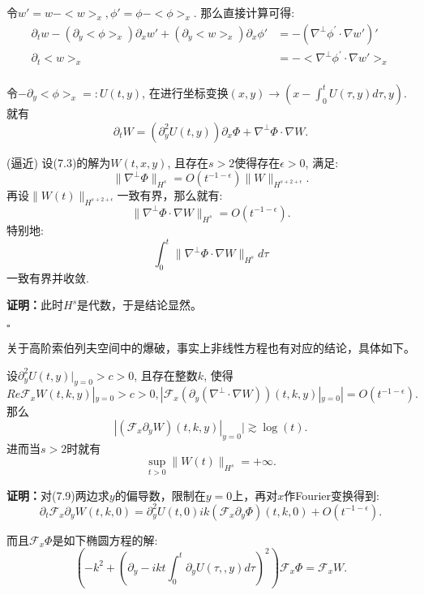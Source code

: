 令$w'=w-<w>_x,\phi'=\phi-<\phi>_x$. 那么直接计算可得:
\[
\begin{aligned}
\partial_t w-(\partial_y<\phi>_x)\partial_x w'+(\partial_y<w>_x)\partial_x\phi'&=-(\nabla^{\perp}\phi^{'}\cdot\nabla w')'\\
\partial_t <w>_x&=-<\nabla^{\perp}\phi^{'}\cdot\nabla w'>_x \\
\end{aligned}
\]

令$-\partial_y <\phi>_x=:U(t,y)$, 在进行坐标变换$(x,y)\rightarrow(x-\int_0^t U(\tau,y)d\tau,y)$. 就有
\begin{equation}
\partial_t W=(\partial_y^2 U(t,y))\partial_x\Phi+\nabla^{\perp}\Phi\cdot\nabla W.
\end{equation}

\begin{thm}\songti\rm (逼近)
设(7.3)的解为$W(t,x,y)$, 且存在$s>2$使得存在$\epsilon>0$, 满足:$$\|\nabla^{\perp}\Phi\|_{H^s}=O(t^{-1-\epsilon})\|W\|_{H^{s+2+\epsilon}}.$$ 再设$\|W(t)\|_{H^{s+2+\epsilon}}$一致有界，那么就有:
$$\|\nabla^{\perp}\Phi\cdot\nabla W\|_{H^s}=O(t^{-1-\epsilon}).$$ 特别地:$$\int_0^t\|\nabla^{\perp}\Phi\cdot\nabla W\|_{H^s}d\tau$$一致有界并收敛.
\end{thm}

\textbf{证明：}此时$H^s$是代数，于是结论显然。
\begin{flushright}
$\square$
\end{flushright}

关于高阶索伯列夫空间中的爆破，事实上非线性方程也有对应的结论，具体如下。
\begin{thm}\songti\rm
设$\partial_y^2U(t,y)|_{y=0}>c>0$, 且存在整数$k$, 使得$$Re\mathcal{F}_xW(t,k,y)|_{y=0}>c>0, |\mathcal{F}_x(\partial_y (\nabla^{\perp}\cdot\nabla W))(t,k,y)|_{y=0}|=O(t^{-1-\epsilon}).$$ 那么$$|(\mathcal{F}_x\partial_y W)(t,k,y)|_{y=0}|\gtrsim\log(t).$$ 进而当$s>2$时就有$$\sup_{t>0}\|W(t)\|_{H^s}=+\infty.$$
\end{thm}

\textbf{证明：}对(7.9)两边求$y$的偏导数，限制在$y=0$上，再对$x$作Fourier变换得到:
\begin{equation}
\partial_t\mathcal{F}_x \partial_y W(t,k,0)=\partial_y^2 U(t,0)ik(\mathcal{F}_x\partial_y\Phi)(t,k,0)+O(t^{-1-\epsilon}).
\end{equation}

而且$\mathcal{F}_x\Phi$是如下椭圆方程的解:
$$\left(-k^2+\left(\partial_y -ikt\int_0^t\partial_y U(\tau,,y)d\tau\right)^2\right)\mathcal{F}_x\Phi=\mathcal{F}_x W.$$

